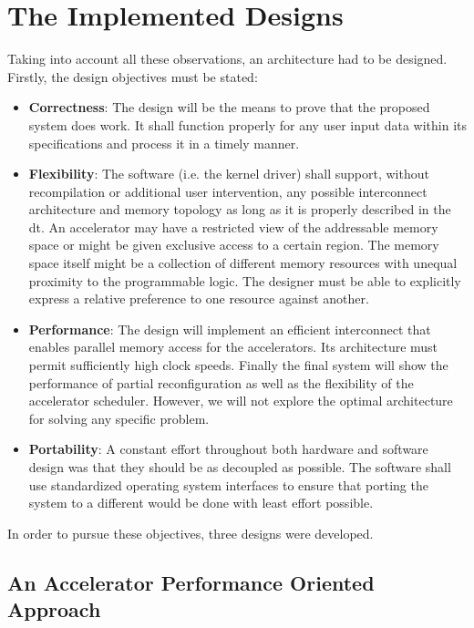\section{The Implemented Designs}

Taking into account all these observations, an architecture had to be designed.
Firstly, the design objectives must be stated:

\begin{itemize}
\item	\textbf{Correctness}:
	The design will be the means to prove that the proposed system does work.
	It shall function properly for any user input data within its specifications
	and process it in a timely manner.
\item	\textbf{Flexibility}:
	The software (i.e. the kernel driver) shall support,
	without recompilation or additional user intervention,
	any possible interconnect architecture and memory topology
	as long as it is properly described in the \gls{dt}.
	An accelerator may have a restricted view of the addressable memory space
	or might be given exclusive access to a certain region.
	The memory space itself might be a collection of different memory resources
	with unequal proximity to the programmable logic.
	The designer must be able to explicitly express a relative preference
	to one resource against another.
\item	\textbf{Performance}:
	The design will implement an efficient interconnect that enables
	parallel memory access for the accelerators.
	Its architecture must permit sufficiently high clock speeds.
	Finally the final system will show the performance of partial reconfiguration
	as well as the flexibility of the accelerator scheduler.
	However, we will not explore the optimal architecture for solving any specific problem.
\item	\textbf{Portability}:
	A constant effort throughout both hardware and software design was that they should be
	as decoupled as possible. The software shall use standardized operating system
	interfaces to ensure that porting the system to a different would be done with
	least effort possible.
\end{itemize}

In order to pursue these objectives, three designs were developed.

\subsection{An Accelerator Performance Oriented Approach}

